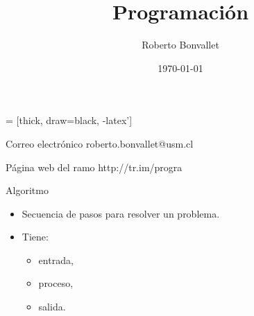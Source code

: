 \documentclass[11pt]{beamer}
\title {Programación}
\author{Roberto Bonvallet}
\date{\today}
\begin{document}

 = [thick, draw=black, -latex']

\begin{frame}
    \titlepage
\end{frame}

\begin{frame}
    \begin{block}{Correo electrónico}
        roberto.bonvallet@usm.cl
    \end{block}
    \begin{block}{Página web del ramo}
        http://tr.im/progra
    \end{block}
\end{frame}

\begin{frame}
    \begin{block}{Algoritmo}
        \begin{itemize}
            \item Secuencia de pasos para resolver un problema.
            \item Tiene:
                \begin{itemize}
                    \item entrada,
                    \item proceso,
                    \item salida.
                \end{itemize}
        \end{itemize}
    \end{block}
\end{frame}
    
\end{document}
